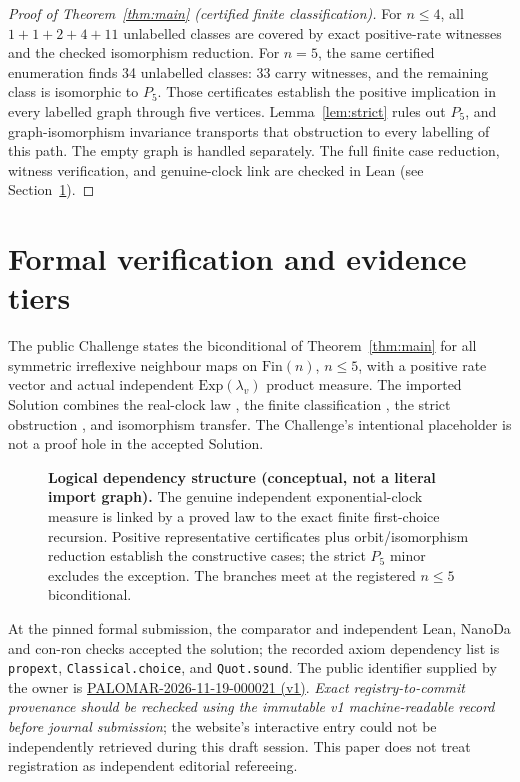 \documentclass[11pt,a4paper]{article}
\begin{document}
\begin{proof}[Proof of Theorem~\ref{thm:main} (certified finite classification)]
For $n\le4$, all $1+1+2+4+11$ unlabelled classes are covered by exact positive-rate witnesses and the checked isomorphism reduction.  For $n=5$, the same certified enumeration finds 34 unlabelled classes: 33 carry witnesses, and the remaining class is isomorphic to $P_5$.  Those certificates establish the positive implication in every labelled graph through five vertices.  Lemma~\ref{lem:strict} rules out $P_5$, and graph-isomorphism invariance transports that obstruction to every labelling of this path.  The empty graph is handled separately.  The full finite case reduction, witness verification, and genuine-clock link are checked in Lean (see Section~\ref{sec:formal}).
\end{proof}

\section{Formal verification and evidence tiers}\label{sec:formal}
The public Challenge states the biconditional of Theorem~\ref{thm:main} for all symmetric irreflexive neighbour maps on $\mathrm{Fin}(n)$, $n\le5$, with a positive rate vector and actual independent $\mathrm{Exp}(\lambda_v)$ product measure.  The imported Solution combines the real-clock law , the finite classification , the strict obstruction , and isomorphism transfer.  The Challenge's intentional placeholder is not a proof hole in the accepted Solution.

\begin{figure}[htbp]\centering\scalebox{.87}{\figarchitecture}
\caption{\textbf{Logical dependency structure (conceptual, not a literal import graph).}  The genuine independent exponential-clock measure is linked by a proved law to the exact finite first-choice recursion.  Positive representative certificates plus orbit/isomorphism reduction establish the constructive cases; the strict $P_5$ minor excludes the exception.  The branches meet at the registered $n\le5$ biconditional.}\label{fig:architecture}\end{figure}

At the pinned formal submission, the comparator and independent Lean, NanoDa and con-ron checks accepted the solution; the recorded axiom dependency list is \texttt{propext}, \texttt{Classical.choice}, and \texttt{Quot.sound}.  The public identifier supplied by the owner is \href{https://palomar-registry.org/entry.html?id=PALOMAR-2026-11-19-000021\&version=1}{PALOMAR-2026-11-19-000021 (v1)}.  \emph{Exact registry-to-commit provenance should be rechecked using the immutable v1 machine-readable record before journal submission}; the website's interactive entry could not be independently retrieved during this draft session.  This paper does not treat registration as independent editorial refereeing.
\end{document}
